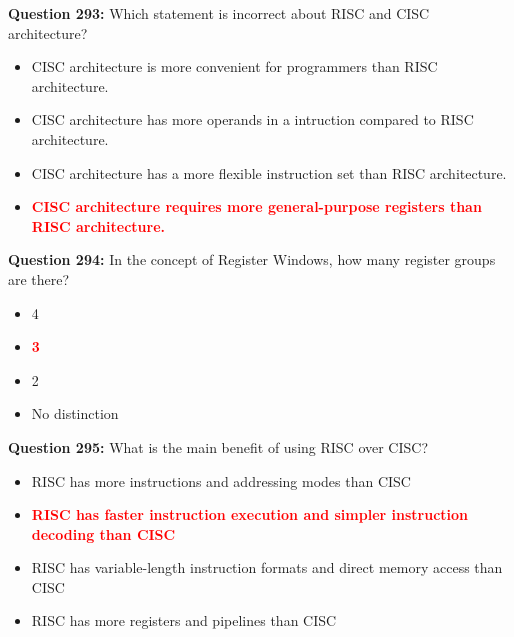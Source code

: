 \documentclass[12pt,a4paper]{article}
\begin{document}
\vspace{0.5cm}

\textbf{Question 293:} Which statement is incorrect about RISC and CISC architecture?

\begin{itemize}
    \item[\textbf{A.}] CISC architecture is more convenient for programmers than RISC architecture.
    \item[\textbf{B.}] CISC architecture has more operands in a intruction compared to RISC architecture.
    \item[\textbf{C.}] CISC architecture has a more flexible instruction set than RISC architecture.
    \item[\textbf{D.}] \textcolor{red}{\textbf{CISC architecture requires more general-purpose registers than RISC architecture.}}
\end{itemize}

\vspace{0.5cm}

\textbf{Question 294:} In the concept of Register Windows, how many register groups are there?

\begin{itemize}
    \item[\textbf{A.}] 4
    \item[\textbf{B.}] \textcolor{red}{\textbf{3}}
    \item[\textbf{C.}] 2
    \item[\textbf{D.}] No distinction
\end{itemize}

\vspace{0.5cm}

\textbf{Question 295:} What is the main benefit of using RISC over CISC?

\begin{itemize}
    \item[\textbf{A.}] RISC has more instructions and addressing modes than CISC
    \item[\textbf{B.}] \textcolor{red}{\textbf{RISC has faster instruction execution and simpler instruction decoding than CISC}}
    \item[\textbf{C.}] RISC has variable-length instruction formats and direct memory access than CISC
    \item[\textbf{D.}] RISC has more registers and pipelines than CISC
\end{itemize}

\vspace{0.5cm}
\end{document}
